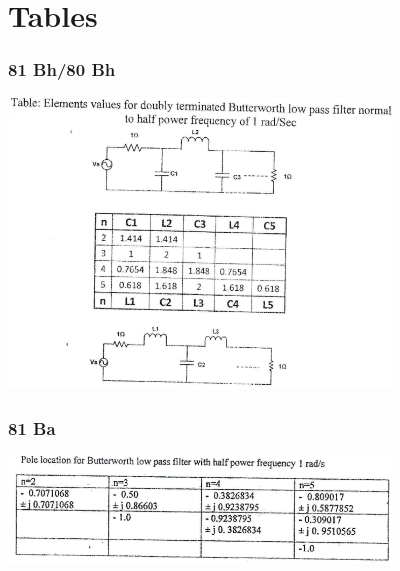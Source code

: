 \documentclass[12pt]{article}
\begin{document}
	\pagebreak

\section{Tables}
\label{sec:tables_81bh}
\subsubsection{81 Bh/80 Bh}
\includegraphics[width=4in]{./pics/fd_2}
\label{sec:tables_81ba}
\subsubsection{81 Ba}
\includegraphics[width=4in]{./pics/fd_3}
\label{sec:tables_80bh}
\end{document}
